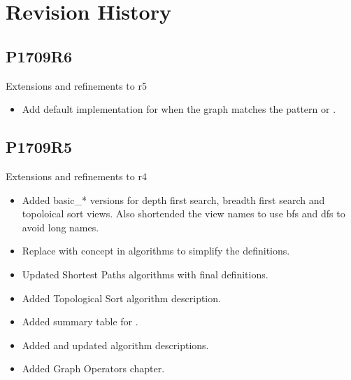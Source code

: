 \chapter*{Revision History}

\section*{P1709R6}
Extensions and refinements to r5
\begin{itemize}
\item Add default implementation for  when the graph matches the pattern  
      or .
\end{itemize}

\section*{P1709R5}
Extensions and refinements to r4
\begin{itemize}
\item Added basic\_* versions for depth first search, breadth first search and topoloical sort views. Also shortended the view names to use bfs and dfs to avoid long names.
\item Replace  with  concept in algorithms to simplify the definitions.
\item Updated Shortest Paths algorithms with final definitions.
\item Added Topological Sort algorithm description.
\item Added summary table for .
\item Added and updated algorithm descriptions.
\item Added Graph Operators chapter.
\end{itemize}

